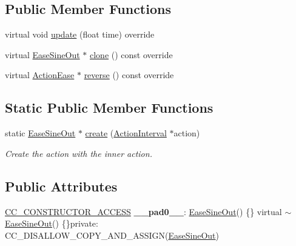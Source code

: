 \subsection*{Public Member Functions}
\begin{DoxyCompactItemize}
\item 
virtual void \hyperlink{classEaseSineOut_ab22bfc099303b7e48a1f8c308a930e66}{update} (float time) override
\item 
virtual \hyperlink{classEaseSineOut}{Ease\+Sine\+Out} $\ast$ \hyperlink{classEaseSineOut_ae364e7d3ac055bea87dc624642709fd6}{clone} () const override
\item 
virtual \hyperlink{classActionEase}{Action\+Ease} $\ast$ \hyperlink{classEaseSineOut_a7fb6a1800ff40fa9cc4fc1ccf90f2540}{reverse} () const override
\end{DoxyCompactItemize}
\subsection*{Static Public Member Functions}
\begin{DoxyCompactItemize}
\item 
static \hyperlink{classEaseSineOut}{Ease\+Sine\+Out} $\ast$ \hyperlink{classEaseSineOut_aab4dbc2d5f658e13eef3ec8c026efab7}{create} (\hyperlink{classActionInterval}{Action\+Interval} $\ast$action)
\begin{DoxyCompactList}\small\item\em Create the action with the inner action. \end{DoxyCompactList}\end{DoxyCompactItemize}
\subsection*{Public Attributes}
\begin{DoxyCompactItemize}
\item 
\mbox{\label{classEaseSineOut_a922e7fc817efb28d5090c105e1a0c134}} 
\hyperlink{_2cocos2d_2cocos_2base_2ccConfig_8h_a25ef1314f97c35a2ed3d029b0ead6da0}{C\+C\+\_\+\+C\+O\+N\+S\+T\+R\+U\+C\+T\+O\+R\+\_\+\+A\+C\+C\+E\+SS} {\bfseries \+\_\+\+\_\+pad0\+\_\+\+\_\+}\+: \hyperlink{classEaseSineOut}{Ease\+Sine\+Out}() \{\} virtual $\sim$\hyperlink{classEaseSineOut}{Ease\+Sine\+Out}() \{\}private\+: C\+C\+\_\+\+D\+I\+S\+A\+L\+L\+O\+W\+\_\+\+C\+O\+P\+Y\+\_\+\+A\+N\+D\+\_\+\+A\+S\+S\+I\+GN(\hyperlink{classEaseSineOut}{Ease\+Sine\+Out})
\end{DoxyCompactItemize}
